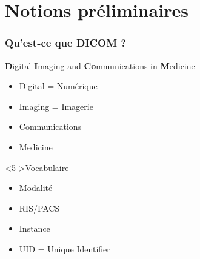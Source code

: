\section{Notions pr\'eliminaires}

	\frame
	{
		\frametitle{Qu'est-ce que DICOM ?}
		
		\begin{block}{\textbf{D}igital \textbf{I}maging and \textbf{Co}mmunications in \textbf{M}edicine}
			\begin{itemize}
				\item<2-> Digital = Num\'erique
		    	\item<2-> Imaging = Imagerie
		    	\item<3-> Communications
		    	\item<4-> Medicine
			\end{itemize}
		\end{block}
		
		\begin{block}<5->{Vocabulaire}
		\begin{itemize}
			\item<6-> Modalit\'e
			\item<7-> RIS/PACS
			\item<8-> Instance
			\item<9-> UID = Unique Identifier
		\end{itemize}
		\end{block}
	}
	
